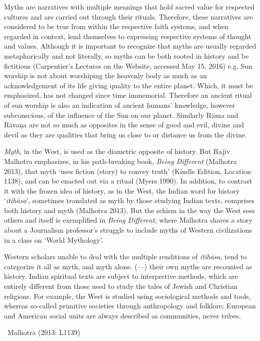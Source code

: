 Myths are narratives with multiple meanings that hold sacred value for respected cultures and are carried out through their rituals. Therefore, these narratives are considered to be true from within the respective faith systems, and when regarded in context, lend themselves to expressing respective systems of thought and values. Although it is important to recognize that myths are usually regarded metaphorically and not literally, so myths can be both rooted in history and be fictitious (Carpentier’s Lectures on the Website, accessed May 15, 2016) e.g. Sun worship is not about worshiping the heavenly body as much as an acknowledgement of its life giving quality to the entire planet. Which, it must be emphasized, has not changed since time immemorial. Therefore an ancient ritual of sun worship is also an indication of ancient humans’ knowledge, however subconscious, of the influence of the Sun on our planet. Similarly Rāma and Rāvaṇa are not so much as opposites in the sense of good and evil, divine and devil as they are qualities that bring us close to or distance us from the divine.

\textit{Myth}, in the West, is used as the diametric opposite of history. But Rajiv Malhotra emphasizes, in his path-breaking book, \textit{Being Different} (Malhotra 2013), that myth ‘uses fiction (story) to convey truth’ (Kindle Edition, Location 1138), and can be enacted out via a ritual (Myers 1990). In addition, to contrast it with the frozen idea of history, as in the West, the Indian word for history ‘\textit{itihāsa}’, sometimes translated as myth by those studying Indian texts, comprises both history and myth (Malhotra 2013). But the schism in the way the West sees others and itself is exemplified in \textit{Being Different}, where Malhotra shares a story about a Journalism professor’s struggle to include myths of Western civilizations in a class on ‘World Mythology’.

\begin{myquote}
Western scholars unable to deal with the multiple renditions of \textit{itihāsa}, tend to categorize it all as myth, and myth alone. (---) their own myths are recounted as history. Indian spiritual texts are subject to interpretive methods, which are entirely different from those used to study the tales of Jewish and Christian religions. For example, the West is studied using sociological methods and tools, whereas so-called primitive societies through anthropology and folklore; European and American social units are always described as communities, never tribes.

~\hfill Malhotra (2013: L1139)
\end{myquote}

